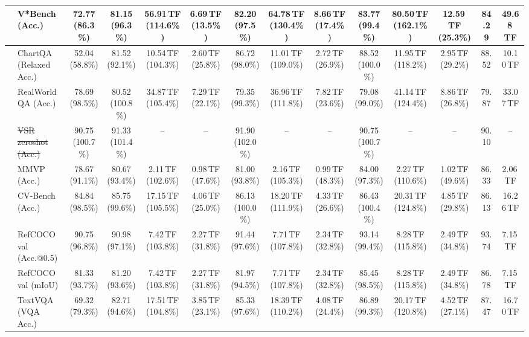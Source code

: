 \begin{table}[t]
\begin{center}
\begin{small}
\begin{sc}
{\begin{tabular}{llcccccccccccc}
& V*Bench (Acc.) & 72.77 (86.3\%) & 81.15 (96.3\%) & 56.91\,TF (114.6\%) & 6.69\,TF (13.5\%) & 82.20 (97.5\%) & 64.78\,TF (130.4\%) & 8.66\,TF (17.4\%) & 83.77 (99.4\%) & 80.50\,TF (162.1\%) & 12.59\,TF (25.3\%) & 84.29 & 49.68\,TF \\
\midrule
{}
& ChartQA (Relaxed Acc.) & 52.04 (58.8\%) & 81.52 (92.1\%) & 10.54\,TF (104.3\%) & 2.60\,TF (25.8\%) & 86.72 (98.0\%) & 11.01\,TF (109.0\%) & 2.72\,TF (26.9\%) & 88.52 (100.0\%) & 11.95\,TF (118.2\%) & 2.95\,TF (29.2\%) & 88.52 & 10.10\,TF \\
& RealWorldQA (Acc.) & 78.69 (98.5\%) & 80.52 (100.8\%) & 34.87\,TF (105.4\%) & 7.29\,TF (22.1\%) & 79.35 (99.3\%) & 36.96\,TF (111.8\%) & 7.82\,TF (23.6\%) & 79.08 (99.0\%) & 41.14\,TF (124.4\%) & 8.86\,TF (26.8\%) & 79.87 & 33.07\,TF \\
& \sout{VSR zeroshot (Acc.)} & 90.75 (100.7\%) & 91.33 (101.4\%) & -- & -- & 91.90 (102.0\%) & -- & -- & 90.75 (100.7\%) & -- & -- & 90.10 & -- \\
& MMVP (Acc.) & 78.67 (91.1\%) & 80.67 (93.4\%) & 2.11\,TF (102.6\%) & 0.98\,TF (47.6\%) & 81.00 (93.8\%) & 2.16\,TF (105.3\%) & 0.99\,TF (48.3\%) & 84.00 (97.3\%) & 2.27\,TF (110.6\%) & 1.02\,TF (49.6\%) & 86.33 & 2.06\,TF \\
& CV-Bench (Acc.) & 84.84 (98.5\%) & 85.75 (99.6\%) & 17.15\,TF (105.5\%) & 4.06\,TF (25.0\%) & 86.13 (100.0\%) & 18.20\,TF (111.9\%) & 4.33\,TF (26.6\%) & 86.43 (100.4\%) & 20.31\,TF (124.8\%) & 4.85\,TF (29.8\%) & 86.13 & 16.26\,TF \\
& RefCOCO val (Acc.@0.5) & 90.75 (96.8\%) & 90.98 (97.1\%) & 7.42\,TF (103.8\%) & 2.27\,TF (31.8\%) & 91.44 (97.6\%) & 7.71\,TF (107.8\%) & 2.34\,TF (32.8\%) & 93.14 (99.4\%) & 8.28\,TF (115.8\%) & 2.49\,TF (34.8\%) & 93.74 & 7.15\,TF \\
& RefCOCO val (mIoU) & 81.33 (93.7\%) & 81.20 (93.6\%) & 7.42\,TF (103.8\%) & 2.27\,TF (31.8\%) & 81.97 (94.5\%) & 7.71\,TF (107.8\%) & 2.34\,TF (32.8\%) & 85.45 (98.5\%) & 8.28\,TF (115.8\%) & 2.49\,TF (34.8\%) & 86.78 & 7.15\,TF \\
& TextVQA (VQA Acc.) & 69.32 (79.3\%) & 82.71 (94.6\%) & 17.51\,TF (104.8\%) & 3.85\,TF (23.1\%) & 85.33 (97.6\%) & 18.39\,TF (110.2\%) & 4.08\,TF (24.4\%) & 86.89 (99.3\%) & 20.17\,TF (120.8\%) & 4.52\,TF (27.1\%) & 87.47 & 16.70\,TF \\

\end{tabular}}
\end{sc}
\end{small}
\end{center}
\end{table}
